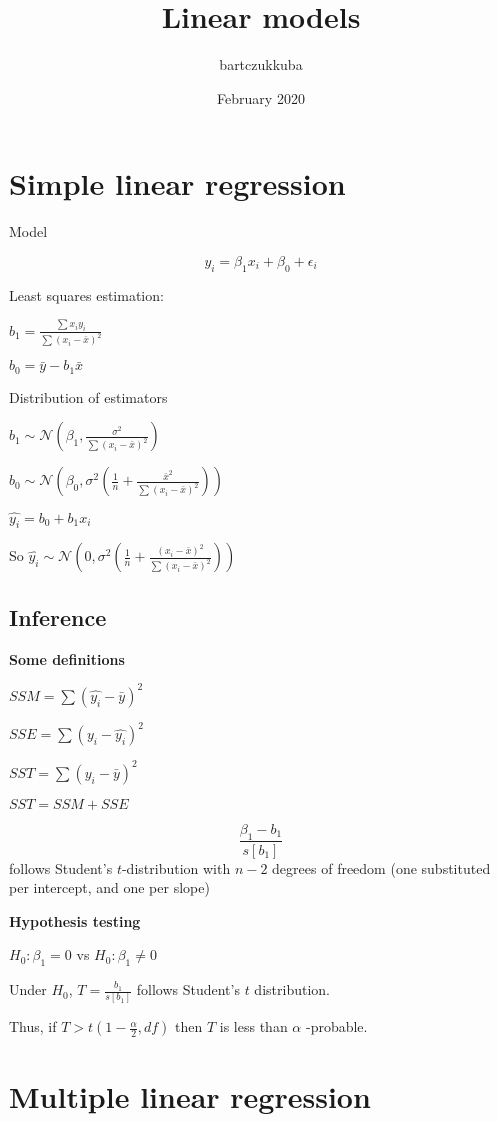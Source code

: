 \documentclass{article}
\title{Linear models}
\author{bartczukkuba }
\date{February 2020}
\begin{document}
\maketitle

\section{Simple linear regression}

Model

$$y_i = \beta_1 x_i + \beta_0 + \epsilon_i$$


Least squares estimation:

$b_1 = \frac{\sum x_i y_i}{\sum (x_i - \bar{x})^2}$

$b_0 = \bar{y} - b_1 \bar{x}$

Distribution of estimators

$b_1 \sim \mathcal{N}(\beta_1, \frac{\sigma^2}{\sum (x_i - \bar{x})^2}) $

$b_0 \sim \mathcal{N}(\beta_0, \sigma^2(\frac{1}{n} + \frac{\bar{x}^2}{\sum (x_i - \bar{x})^2})) $

$\hat{y_i} = b_0 + b_1 x_i $

So $\hat{y_i} \sim \mathcal{N}(0, \sigma^2(\frac{1}{n} + \frac{(x_i - \bar{x})^2}{\sum (x_i - \bar{x})^2}))$

\subsection{Inference}

\textbf{Some definitions}

$SSM = \sum(\hat{y_i} - \bar{y})^2$

$SSE = \sum(y_i - \hat{y_i})^2$

$SST = \sum(y_i - \bar{y})^2$

$SST = SSM + SSE$


$$\frac{\beta_1 - b_1}{s[b_1]}$$ follows Student's $t$-distribution with $n-2$ degrees of freedom (one substituted per intercept, and one per slope)

\textbf{Hypothesis testing}


$H_0 : \beta_1 = 0$ vs $H_0 : \beta_1 \neq 0$

Under $H_0$, $T= \frac{b_1}{s[b_1]}$ follows Student's $t$ distribution.

Thus, if $T > t(1-\frac{\alpha}{2}, df)$ then $T$ is less than $\alpha$ -probable.


\section{Multiple linear regression}
\end{document}
